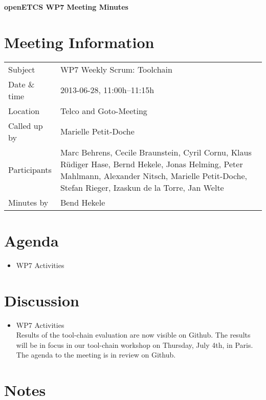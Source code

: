 \documentclass[a4paper, 11pt]{article}
\begin{document}
{\begin{center}\huge\bf openETCS WP7 Meeting Minutes\end{center}}
\section{Meeting Information}

\renewcommand{\arraystretch}{1.5}
\begin{supertabular}{m{.2\textwidth}m{.8\textwidth}}
Subject & WP7 Weekly Scrum: Toolchain\\
Date \& time & 2013-06-28, 11:00h--11:15h\\
Location & Telco and Goto-Meeting\\
Called up by & Marielle Petit-Doche\\
Participants &
Marc Behrens,
Cecile Braunstein,
Cyril Cornu,
Klaus R\"udiger Hase,
Bernd Hekele,
Jonas Helming,
Peter Mahlmann,
Alexander Nitsch,
Marielle Petit-Doche,
Stefan Rieger,
Izaskun de la Torre,
Jan Welte\\


Minutes by & Bend Hekele\\

\end{supertabular}
\renewcommand{\arraystretch}{1.0}


\section{Agenda}
\begin{itemize}
\item WP7 Activities
\end{itemize}

\section{Discussion}

\begin{itemize}
\item WP7 Activities\\
Results of the tool-chain evaluation are now visible on Github. The results will be in focus in our tool-chain workshop on Thursday, July 4th, in Paris. The agenda to the meeting is in review on Github.\\

\end{itemize}

\section{Notes}
\end{document}
